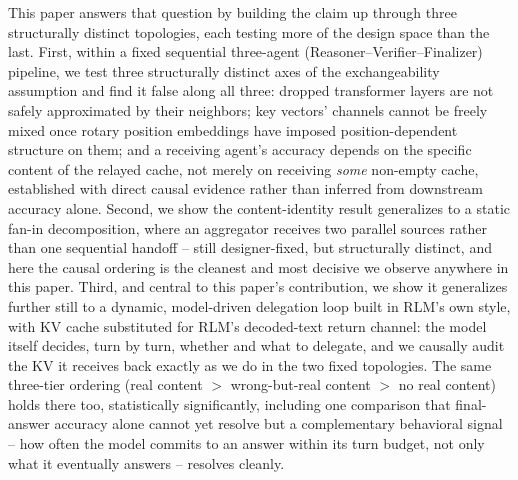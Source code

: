 \documentclass[11pt]{article}
\begin{document}
This paper answers that question by building the claim up through three
structurally distinct topologies, each testing more of the design space
than the last. First, within a fixed sequential three-agent
(Reasoner--Verifier--Finalizer) pipeline, we test three structurally
distinct axes of the exchangeability assumption and find it false along
all three: dropped transformer layers are not safely approximated by
their neighbors; key vectors' channels cannot be freely mixed once
rotary position embeddings have imposed position-dependent structure on
them; and a receiving agent's accuracy depends on the specific content of
the relayed cache, not merely on receiving \emph{some} non-empty cache,
established with direct causal evidence rather than inferred from
downstream accuracy alone. Second, we show the content-identity result
generalizes to a static fan-in decomposition, where an aggregator
receives two parallel sources rather than one sequential handoff --
still designer-fixed, but structurally distinct, and here the causal
ordering is the cleanest and most decisive we observe anywhere in this
paper. Third, and central to this paper's contribution, we show it
generalizes further still to a dynamic, model-driven delegation loop
built in RLM's own style, with KV cache substituted for RLM's
decoded-text return channel: the model itself decides, turn by turn,
whether and what to delegate, and we causally audit the KV it receives
back exactly as we do in the two fixed topologies. The same three-tier
ordering (real content $>$ wrong-but-real content $>$ no real content)
holds there too, statistically significantly, including one comparison
that final-answer accuracy alone cannot yet resolve but a complementary
behavioral signal -- how often the model commits to an answer within its
turn budget, not only what it eventually answers -- resolves cleanly.
\end{document}
